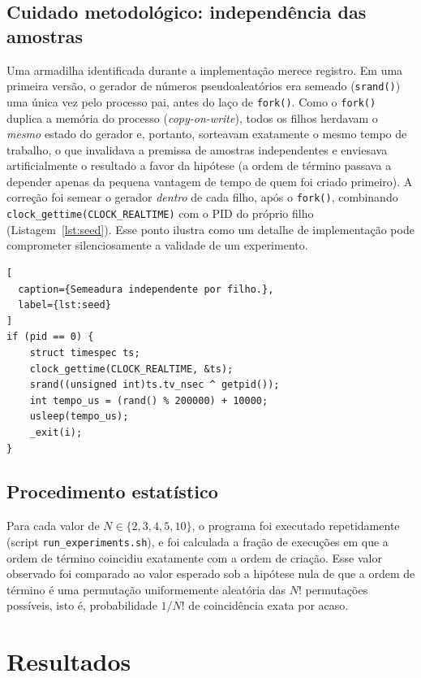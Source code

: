 \documentclass[conference]{IEEEtran}
\begin{document}
\subsection{Cuidado metodológico: independência das amostras}

Uma armadilha identificada durante a implementação merece registro. Em uma
primeira versão, o gerador de números pseudoaleatórios era semeado
(\texttt{srand()}) uma única vez pelo processo pai, antes do laço de
\texttt{fork()}. Como o \texttt{fork()} duplica a memória do processo
(\emph{copy-on-write}), todos os filhos herdavam o \emph{mesmo} estado do
gerador e, portanto, sorteavam exatamente o mesmo tempo de trabalho, o que
invalidava a premissa de amostras independentes e enviesava artificialmente
o resultado a favor da hipótese (a ordem de término passava a depender
apenas da pequena vantagem de tempo de quem foi criado primeiro). A correção
foi semear o gerador \emph{dentro} de cada filho, após o \texttt{fork()},
combinando \texttt{clock\_gettime(CLOCK\_REALTIME)} com o PID do próprio
filho (Listagem~\ref{lst:seed}). Esse ponto ilustra como um detalhe de
implementação pode comprometer silenciosamente a validade de um experimento.

\begin{lstlisting}[
  caption={Semeadura independente por filho.},
  label={lst:seed}
]
if (pid == 0) {
    struct timespec ts;
    clock_gettime(CLOCK_REALTIME, &ts);
    srand((unsigned int)ts.tv_nsec ^ getpid());
    int tempo_us = (rand() % 200000) + 10000;
    usleep(tempo_us);
    _exit(i);
}
\end{lstlisting}

\subsection{Procedimento estatístico}

Para cada valor de $N \in \{2,3,4,5,10\}$, o programa foi executado
repetidamente (script \texttt{run\_experiments.sh}), e foi calculada a
fração de execuções em que a ordem de término coincidiu exatamente com a
ordem de criação. Esse valor observado foi comparado ao valor esperado sob
a hipótese nula de que a ordem de término é uma permutação uniformemente
aleatória das $N!$ permutações possíveis, isto é, probabilidade $1/N!$ de
coincidência exata por acaso.

\section{Resultados}
\end{document}
